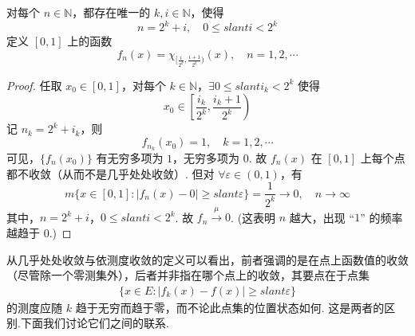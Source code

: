 \documentclass[../../main.tex]{subfiles}
\begin{document}
\begin{example}[依测度收敛但不几乎处处收敛的函数]

对每个 $n\in\mathbb{N}$，都存在唯一的 $k,i\in\mathbb{N}$，使得
\[
n = 2^k + i,\quad 0\leqslant slant i<2^k
\]
定义 $[0,1]$ 上的函数
\[
f_n(x)=\chi_{[\frac{i}{2^k},\frac{i + 1}{2^k})}(x),\quad n = 1,2,\cdots
\]
\end{example}
\begin{proof}
任取 $x_0\in[0,1]$，对每个 $k\in\mathbb{N}$，$\exists 0\leqslant slant i_k<2^k$ 使得
\[
x_0\in\left[\frac{i_k}{2^k},\frac{i_k + 1}{2^k}\right)
\]
记 $n_k = 2^k + i_k$，则
\[
f_{n_k}(x_0)=1,\quad k = 1,2,\cdots
\]
可见，$\{f_n(x_0)\}$ 有无穷多项为 $1$，无穷多项为 $0$. 故 $f_n(x)$ 在 $[0,1]$ 上每个点都不收敛（从而不是几乎处处收敛）. 但对 $\forall\varepsilon\in(0,1)$，有
\[
m\{x\in[0,1]:\vert f_n(x)-0\vert\geqslant slant\varepsilon\}=\frac{1}{2^k}\to 0,\quad n\to\infty
\]
其中，$n = 2^k + i$，$0\leqslant slant i<2^k$. 故 $f_n\stackrel{\mu}{\longrightarrow}0$. (这表明 $n$ 越大，出现 “$1$” 的频率越趋于 $0$.) 
\end{proof}

\vspace{0.4cm}

从几乎处处收敛与依测度收敛的定义可以看出，前者强调的是在点上函数值的收敛（尽管除一个零测集外），后者并非指在哪个点上的收敛，其要点在于点集
\begin{align*}
\{x\in E:\vert f_k(x)-f(x)\vert\geqslant slant\varepsilon\}
\end{align*}
的测度应随 $k$ 趋于无穷而趋于零，而不论此点集的位置状态如何. 这是两者的区别.下面我们讨论它们之间的联系.
\end{document}
